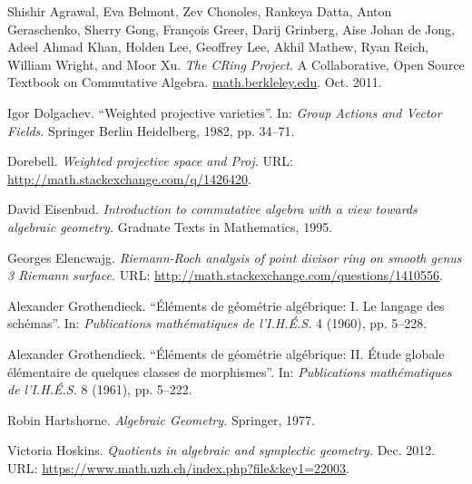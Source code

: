 \documentclass[10pt,notitlepage]{article}
\numberwithin{equation}{subsection}
\begin{document}
    \begin{thebibliography}{99}

            Shishir Agrawal, Eva Belmont, Zev Chonoles, Rankeya Datta, Anton Geraschenko, Sherry Gong, François Greer, Darij Grinberg, Aise Johan de Jong, Adeel Ahmad Khan, Holden Lee, Geoffrey Lee, Akhil Mathew, Ryan Reich, William Wright, and Moor Xu.
            \emph{The CRing Project.}
            A Collaborative, Open Source Textbook on Commutative Algebra.
            \href{math.berkleley.edu}{\url{math.berkleley.edu}}.
            Oct. 2011.

            Igor Dolgachev.
            ``Weighted projective varieties''.
            In: \emph{Group Actions and Vector Fields}.
            Springer Berlin Heidelberg, 1982, pp. 34--71.

            Dorebell.
            \emph{Weighted projective space and Proj.}
            {\sc URL}: \href{http://math.stackexchange.com/q/1426420}{\url{http://math.stackexchange.com/q/1426420}}.

            David Eisenbud.
            \emph{Introduction to commutative algebra with a view towards algebraic geometry.}
            Graduate Texts in Mathematics, 1995.

            Georges Elencwajg.
            \emph{Riemann-Roch analysis of point divisor ring on smooth genus 3 Riemann surface.}
            {\sc URL}: \href{http://math.stackexchange.com/questions/1410556}{\url{http://math.stackexchange.com/questions/1410556}}.

            Alexander Grothendieck.
            ``Éléments de géométrie algébrique: I. Le langage des schémas''.
            In: \emph{Publications mathématiques de l'I.H.É.S.} 4 (1960), pp. 5--228.

            Alexander Grothendieck.
            ``Éléments de géométrie algébrique: II. Étude globale élémentaire de quelques classes de morphismes''.
            In: \emph{Publications mathématiques de l'I.H.É.S.} 8 (1961), pp. 5--222.

            Robin Hartshorne.
            \emph{Algebraic Geometry.}
            Springer, 1977.

            Victoria Hoskins.
            \emph{Quotients in algebraic and symplectic geometry.}
            Dec. 2012.
            {\sc URL}: \href{https://www.math.uzh.ch/index.php?file&key1=22003}{\url{https://www.math.uzh.ch/index.php?file&key1=22003}}.


\end{thebibliography}
\end{document}
